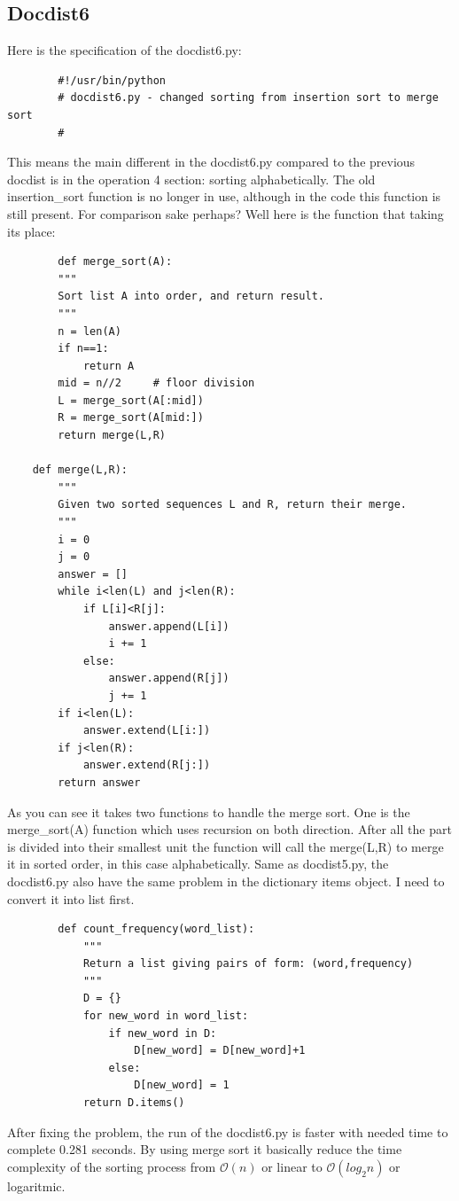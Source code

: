 \documentclass{article}
\begin{document}
    \subsection{Docdist6}
    Here is the specification of the docdist6.py:
    \begin{lstlisting}
        #!/usr/bin/python
        # docdist6.py - changed sorting from insertion sort to merge sort
        #
    \end{lstlisting}
    This means the main different in the docdist6.py compared to the previous docdist is in the operation 4 section: sorting alphabetically.
    The old insertion\_sort function is no longer in use, although in the code this function is still present.
    For comparison sake perhaps? Well here is the function that taking its place:
    \begin{lstlisting}
        def merge_sort(A):
        """
        Sort list A into order, and return result.
        """
        n = len(A)
        if n==1: 
            return A
        mid = n//2     # floor division
        L = merge_sort(A[:mid])
        R = merge_sort(A[mid:])
        return merge(L,R)

    def merge(L,R):
        """
        Given two sorted sequences L and R, return their merge.
        """
        i = 0
        j = 0
        answer = []
        while i<len(L) and j<len(R):
            if L[i]<R[j]:
                answer.append(L[i])
                i += 1
            else:
                answer.append(R[j])
                j += 1
        if i<len(L):
            answer.extend(L[i:])
        if j<len(R):
            answer.extend(R[j:])
        return answer
    \end{lstlisting}
    As you can see it takes two functions to handle the merge sort. One is the merge\_sort(A) function which uses recursion on both direction. 
    After all the part is divided into their smallest unit the function will call the merge(L,R) to merge it in sorted order, in this case alphabetically.
    Same as docdist5.py, the docdist6.py also have the same problem in the dictionary items object. I need to convert it into list first.
    \begin{lstlisting}
        def count_frequency(word_list):
            """
            Return a list giving pairs of form: (word,frequency)
            """
            D = {}
            for new_word in word_list:
                if new_word in D:
                    D[new_word] = D[new_word]+1
                else:
                    D[new_word] = 1
            return D.items()
    \end{lstlisting}
    After fixing the problem, the run of the docdist6.py is faster with needed time to complete 0.281 seconds.
    By using merge sort it basically reduce the time complexity of the sorting process from $\mathcal{O}(n)$ or linear to $\mathcal{O}(log_{2}n)$ or logaritmic.
\end{document}
